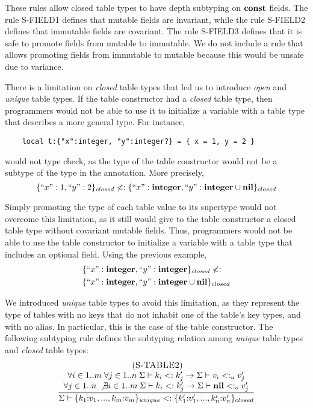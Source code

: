 These rules allow closed table types to have depth subtyping on $\mathbf{const}$ fields.
The rule \textsc{S-FIELD1} defines that mutable fields are invariant,
while the rule \textsc{S-FIELD2} defines that immutable fields are covariant.
The rule \textsc{S-FIELD3} defines that it is safe to promote fields
from mutable to immutable.
We do not include a rule that allows promoting fields from immutable
to mutable because this would be unsafe due to variance.

There is a limitation on \emph{closed} table types that led us to
introduce \emph{open} and \emph{unique} table types.
If the table constructor had a \emph{closed} table type, then
programmers would not be able to use it to initialize a variable with
a table type that describes a more general type.
For instance,
\begin{verbatim}
    local t:{"x":integer, "y":integer?} = { x = 1, y = 2 }
\end{verbatim}
would not type check, as the type of the table constructor would not
be a subtype of the type in the annotation.
More precisely,
\[
\{``x":1, ``y":2\}_{closed} \not<: \{``x":\mathbf{integer}, ``y":\mathbf{integer} \cup \mathbf{nil}\}_{closed}
\]

Simply promoting the type of each table value to its supertype would
not overcome this limitation, as it still would give to the table constructor
a closed table type without covariant mutable fields.
Thus, programmers would not be able to use the table constructor to
initialize a variable with a table type that includes an optional field.
Using the previous example,
\begin{align*}
& \{``x":\mathbf{integer}, ``y":\mathbf{integer}\}_{closed} \not<: \\
& \{``x":\mathbf{integer}, ``y":\mathbf{integer} \cup \mathbf{nil}\}_{closed}
\end{align*}

We introduced \emph{unique} table types to avoid this limitation,
as they represent the type of tables with no keys that do not
inhabit one of the table's key types, and with no alias.
In particular, this is the case of the table constructor.
The following subtyping rule defines the subtyping relation among
\emph{unique} table types and \emph{closed} table types:
\[
\begin{array}{c}
\; (\textsc{S-TABLE2})\\
\dfrac{\begin{array}{c}
       \forall i \in 1..m \; \forall j \in 1..n \;
       \Sigma \vdash k_{i} <: k_{j}' \to \Sigma \vdash v_{i} <:_{u} v_{j}' \\
       \forall j \in 1..n \; \not\exists i \in 1..m \;
       \Sigma \vdash k_{i} <: k_{j}' \to \Sigma \vdash \mathbf{nil} <:_{o} v_{j}'
       \end{array}}
      {\Sigma \vdash \{k_{1}{:}v_{1}, ..., k_{m}{:}v_{m}\}_{unique} <:
                    \{k_{1}'{:}v_{1}', ..., k_{n}'{:}v_{n}'\}_{closed}}
\end{array}
\]

